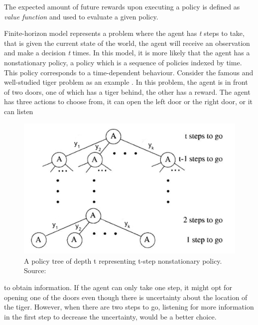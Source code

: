 The expected amount of future rewards upon executing a policy is defined as \textit{value function} and used to evaluate a given policy. \par%
Finite-horizon model represents a problem where the agent has \textit{t} steps to take, that is given the current state of the world, the agent will receive an observation and make a decision \textit{t} times. In this model, it is more likely that the agent has a nonstationary policy, a policy which is a sequence of policies indexed by time. This policy corresponds to a time-dependent behaviour. Consider the famous and well-studied tiger problem as an example \cite{KAELBLING199899, nair2003}. In this problem, the agent is in front of two doors, one of which has a tiger behind, the other has a reward. The agent has three actions to choose from, it can open the left door or the right door, or it can listen 
\begin{figure}
	\begin{center}
		\includegraphics[width=1\linewidth]{figures/policy_tree}
		\caption[A policy tree representing a nonstationary policy of POMDP]{A policy tree of depth t representing t-step nonstationary policy. Source: \cite{KAELBLING199899}}
		\label{fig:policy_tree}
	\end{center}
	\vspace{-40pt}
\end{figure}
to obtain information. If the agent can only take one step, it might opt for opening one of the doors even though there is uncertainty about the location of the tiger. However, when there are two steps to go, listening for more information in the first step to decrease the uncertainty, would be a better choice.\par
